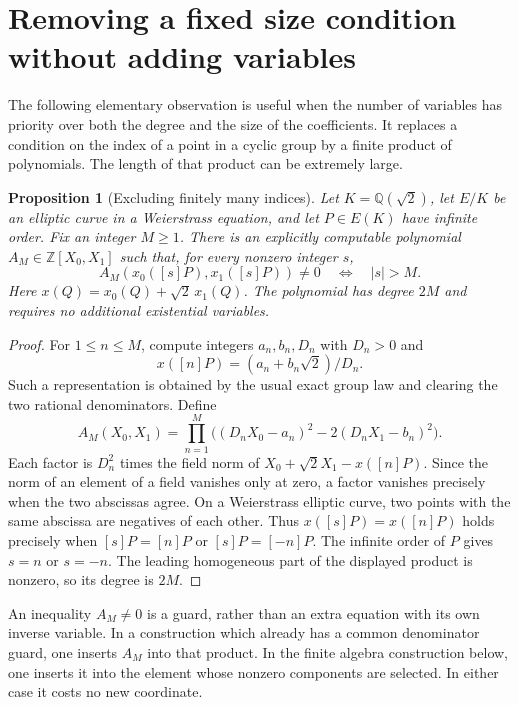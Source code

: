 \documentclass[11pt]{article}
\newtheorem{proposition}[theorem]{Proposition}
\theoremstyle{definition}
\begin{document}
\section{Removing a fixed size condition without adding variables}
\label{sec:finite-anchor}

The following elementary observation is useful when the number of variables
has priority over both the degree and the size of the coefficients.  It
replaces a condition on the index of a point in a cyclic group by a finite
product of polynomials.  The length of that product can be extremely large.

\begin{proposition}[Excluding finitely many indices]\label{prop:finite-anchor}
Let $K=\mathbb Q(\sqrt2)$, let $E/K$ be an elliptic curve in a Weierstrass
equation, and let $P\in E(K)$ have infinite order.  Fix an integer $M\geq1$.
There is an explicitly computable polynomial
$A_M\in\mathbb Z[X_0,X_1]$ such that, for every nonzero integer $s$,
\[
 A_M(x_0([s]P),x_1([s]P))\ne0
 \quad\Longleftrightarrow\quad |s|>M.
\]
Here $x(Q)=x_0(Q)+\sqrt2\,x_1(Q)$.  The polynomial has degree $2M$ and
requires no additional existential variables.
\end{proposition}
\begin{proof}
For $1\leq n\leq M$, compute integers $a_n,b_n,D_n$ with $D_n>0$ and
\[
 x([n]P)=(a_n+b_n\sqrt2)/D_n.
\]
Such a representation is obtained by the usual exact group law and clearing
the two rational denominators.  Define
\[
 A_M(X_0,X_1)=\prod_{n=1}^M
 \bigl((D_nX_0-a_n)^2-2(D_nX_1-b_n)^2\bigr).
\]
Each factor is $D_n^2$ times the field norm of
$X_0+\sqrt2 X_1-x([n]P)$.  Since the norm of an element of a field vanishes
only at zero, a factor vanishes precisely when the two abscissas agree.
On a Weierstrass elliptic curve, two points with the same abscissa are
negatives of each other.  Thus $x([s]P)=x([n]P)$ holds precisely when
$[s]P=[n]P$ or $[s]P=[-n]P$.  The infinite order of $P$ gives $s=n$ or
$s=-n$.  The leading homogeneous part of the displayed product is nonzero,
so its degree is $2M$.
\end{proof}

An inequality $A_M\ne0$ is a guard, rather than an extra equation with its
own inverse variable.  In a construction which already has a common
denominator guard, one inserts $A_M$ into that product.  In the finite
algebra construction below, one inserts it into the element whose nonzero
components are selected.  In either case it costs no new coordinate.
\end{document}
